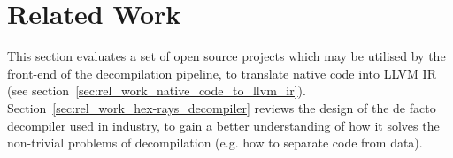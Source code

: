 
\section{Related Work}
\label{sec:related_work}

This section evaluates a set of open source projects which may be utilised by the front-end of the decompilation pipeline, to translate native code into LLVM IR (see section~\ref{sec:rel_work_native_code_to_llvm_ir}). Section~\ref{sec:rel_work_hex-rays_decompiler} reviews the design of the de facto decompiler used in industry, to gain a better understanding of how it solves the non-trivial problems of decompilation (e.g. how to separate code from data).




